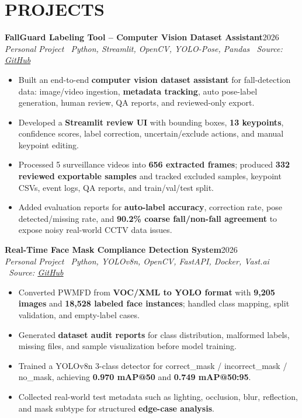 \documentclass[10pt,a4paper]{article}
\newenvironment{cvitems}{%
    \begin{itemize}[leftmargin=1.2em,itemsep=1pt,topsep=1pt,parsep=0pt]
}{%
    \end{itemize}
}
\newcommand{\entryhead}[2]{%
    \noindent\textbf{#1}\hfill #2\\[-2pt]
}
\newcommand{\entrysub}[1]{%
    \noindent\textit{#1}\\[-1pt]
}
\begin{document}
\section{PROJECTS}
\entryhead{FallGuard Labeling Tool -- Computer Vision Dataset Assistant}{2026}
\entrysub{Personal Project \textbar\ Python, Streamlit, OpenCV, YOLO-Pose, Pandas \textbar\ Source: \href{https://github.com/NguyenKhacBao564/autofall-labeler-tool}{GitHub}}
\begin{cvitems}
    \item Built an end-to-end \textbf{computer vision dataset assistant} for fall-detection data: image/video ingestion, \textbf{metadata tracking}, auto pose-label generation, human review, QA reports, and reviewed-only export.
    \item Developed a \textbf{Streamlit review UI} with bounding boxes, \textbf{13 keypoints}, confidence scores, label correction, uncertain/exclude actions, and manual keypoint editing.
    \item Processed 5 surveillance videos into \textbf{656 extracted frames}; produced \textbf{332 reviewed exportable samples} and tracked excluded samples, keypoint CSVs, event logs, QA reports, and train/val/test split.
    \item Added evaluation reports for \textbf{auto-label accuracy}, correction rate, pose detected/missing rate, and \textbf{90.2\% coarse fall/non-fall agreement} to expose noisy real-world CCTV data issues.
\end{cvitems}

\entryhead{Real-Time Face Mask Compliance Detection System}{2026}
\entrysub{Personal Project \textbar\ Python, YOLOv8n, OpenCV, FastAPI, Docker, Vast.ai \textbar\ Source: \href{https://github.com/NguyenKhacBao564/Real-Time-Face-Mask-Compliance-Detection-System}{GitHub}}
\begin{cvitems}
    \item Converted PWMFD from \textbf{VOC/XML to YOLO format} with \textbf{9,205 images} and \textbf{18,528 labeled face instances}; handled class mapping, split validation, and empty-label cases.
    \item Generated \textbf{dataset audit reports} for class distribution, malformed labels, missing files, and sample visualization before model training.
    \item Trained a YOLOv8n 3-class detector for correct\_mask / incorrect\_mask / no\_mask, achieving \textbf{0.970 mAP@50} and \textbf{0.749 mAP@50:95}.
    \item Collected real-world test metadata such as lighting, occlusion, blur, reflection, and mask subtype for structured \textbf{edge-case analysis}.
\end{cvitems}
\end{document}
